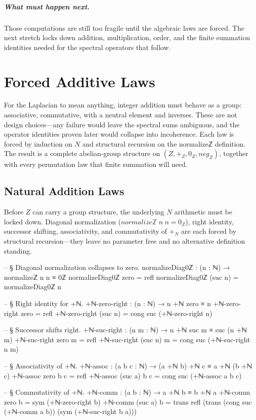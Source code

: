 \documentclass[11pt,a4paper]{book}
\def\mathrm#1{#1}%
\def\mathbb#1{#1}%
\def\texttt#1{#1}%
\begin{document}
\paragraph{What must happen next.}
Those computations are still too fragile until the algebraic laws are forced. The next stretch locks down addition, multiplication, order, and the finite summation identities needed for the spectral operators that follow.

\chapter{Forced Additive Laws}

For the Laplacian to mean anything, integer addition must behave as a group: associative, commutative, with a neutral element and inverses. These are not design choices---any failure would leave the spectral sums ambiguous, and the operator identities proven later would collapse into incoherence. Each law is forced by induction on $\mathbb{N}$ and structural recursion on the \texttt{normalizeℤ} definition. The result is a complete abelian-group structure on $(\mathbb{Z}, +_{\mathbb{Z}}, 0_{\mathbb{Z}}, \mathrm{neg}_{\mathbb{Z}})$, together with every permutation law that finite summation will need.

\section{Natural Addition Laws}

Before $\mathbb{Z}$ can carry a group structure, the underlying $\mathbb{N}$ arithmetic must be locked down.
Diagonal normalization ($\texttt{normalizeℤ}\;n\;n = 0_{\mathbb{Z}}$),
right identity, successor shifting, associativity, and commutativity of $+_{\mathbb{N}}$ are each forced by structural recursion---they leave no parameter free and no alternative definition standing.

\begin{code}
-- § Diagonal normalization collapses to zero.
normalizeDiag0ℤ : (n : ℕ) → normalizeℤ n n ≡ 0ℤ
normalizeDiag0ℤ zero = refl
normalizeDiag0ℤ (suc n) = normalizeDiag0ℤ n

-- § Right identity for +ℕ.
+ℕ-zero-right : (n : ℕ) → n +ℕ zero ≡ n
+ℕ-zero-right zero = refl
+ℕ-zero-right (suc n) = cong suc (+ℕ-zero-right n)

-- § Successor shifts right.
+ℕ-suc-right : (n m : ℕ) → n +ℕ suc m ≡ suc (n +ℕ m)
+ℕ-suc-right zero m = refl
+ℕ-suc-right (suc n) m = cong suc (+ℕ-suc-right n m)

-- § Associativity of +ℕ.
+ℕ-assoc : (a b c : ℕ) → (a +ℕ b) +ℕ c ≡ a +ℕ (b +ℕ c)
+ℕ-assoc zero b c = refl
+ℕ-assoc (suc a) b c = cong suc (+ℕ-assoc a b c)

-- § Commutativity of +ℕ.
+ℕ-comm : (a b : ℕ) → a +ℕ b ≡ b +ℕ a
+ℕ-comm zero b = sym (+ℕ-zero-right b)
+ℕ-comm (suc a) b =
  trans
    refl
    (trans
      (cong suc (+ℕ-comm a b))
      (sym (+ℕ-suc-right b a)))
\end{code}
\end{document}
